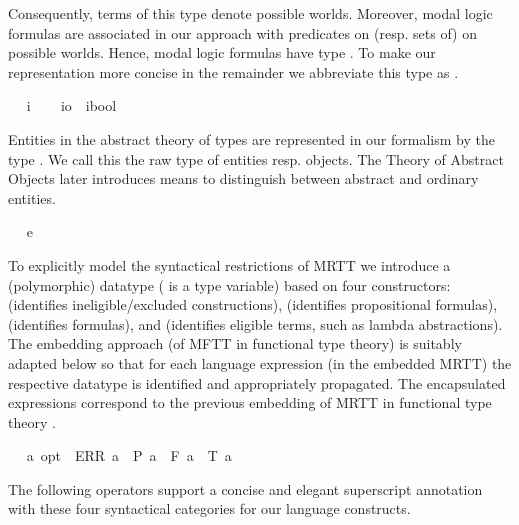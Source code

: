 \begin{isabellebody}
\begin{isamarkuptext}
  Consequently, terms of this type denote possible worlds. 
  Moreover, modal logic formulas are associated in our approach with
  predicates on (resp. sets of) on possible worlds. Hence, modal logic formulas have
  type . To make our representation  more concise in the remainder
  we abbreviate this type as .%
\end{isamarkuptext}%
\isamarkuptrue%
\ \isamarkupfalse%
\ i\ \isanewline
\ \isamarkupfalse%
\ io\ {\isacharequal}\ {\isachardoublequoteopen}{\isacharparenleft}i{\isasymRightarrow}bool{\isacharparenright}{\isachardoublequoteclose}%
\begin{isamarkuptext}%
Entities in the abstract theory of types are represented in our formalism by the
  type . We call this the raw type of entities resp. objects. The Theory of Abstract Objects 
  later introduces means to distinguish between abstract and ordinary entities.%
\end{isamarkuptext}%
\isamarkuptrue%
\ \isamarkupfalse%
\ e%
\begin{isamarkuptext}%
To explicitly model the syntactical restrictions of MRTT we introduce a 
  (polymorphic) datatype  ( is a type variable) 
  based on four constructors:  (identifies ineligible/excluded constructions),  
  (identifies propositional formulas),  (identifies  formulas), and  (identifies 
  eligible terms, such as lambda abstractions). The embedding approach (of MFTT in functional type theory)
  is suitably adapted below so that 
  for each language expression (in the embedded MRTT) the respective datatype 
  is identified and appropriately propagated. The encapsulated expressions  
  correspond to the previous embedding of MRTT in functional type theory  \cite{J23,C40}.%
\end{isamarkuptext}%
\isamarkuptrue%
\ \isamarkupfalse%
\ {\isacharprime}a\ opt\ {\isacharequal}\ ERR\ {\isacharprime}a\ {\isacharbar}\ P\ {\isacharprime}a\ {\isacharbar}\ F\ {\isacharprime}a\ {\isacharbar}\ T\ {\isacharprime}a%
\begin{isamarkuptext}%
The following operators support a concise and elegant superscript annotation with these
  four syntactical categories for our language constructs.%
\end{isamarkuptext}%

\end{isabellebody}

